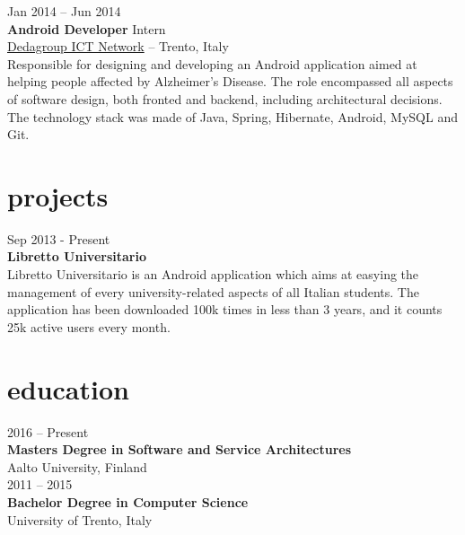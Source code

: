 \documentclass[]{friggeri-cv}
\begin{document}
{Jan 2014 -- Jun 2014} \\
{\textbf{Android Developer} Intern} \\
{\href{http://www.dedagroup.it}{Dedagroup ICT Network}} -- {Trento, Italy} \\
{Responsible for designing and developing an Android application aimed at helping people affected by Alzheimer's Disease. The role encompassed all aspects of software design, both fronted and backend, including architectural decisions.
The technology stack was made of Java, Spring, Hibernate, Android, MySQL and Git.}


\section{projects}

{Sep 2013 - Present} \\
{\textbf{Libretto Universitario}} \\
Libretto Universitario is an Android application which aims at easying the management of every university-related aspects of all Italian students. The application has been downloaded 100k times in less than 3 years, and it counts 25k active users every month.






\section{education}

{2016 -- Present} \\
\textbf{Masters Degree {\normalfont in Software and Service Architectures}} \\
{Aalto University, Finland} \\

{2011 -- 2015} \\
\textbf{Bachelor Degree {\normalfont in Computer Science}} \\
{University of Trento, Italy}
\end{document}
